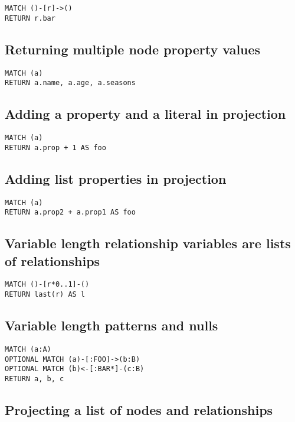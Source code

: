 \begin{lstlisting}
MATCH ()-[r]->()
RETURN r.bar
\end{lstlisting}

\subsection{Returning multiple node property values}

\begin{lstlisting}
MATCH (a)
RETURN a.name, a.age, a.seasons
\end{lstlisting}

\subsection{Adding a property and a literal in projection}

\begin{lstlisting}
MATCH (a)
RETURN a.prop + 1 AS foo
\end{lstlisting}

\subsection{Adding list properties in projection}

\begin{lstlisting}
MATCH (a)
RETURN a.prop2 + a.prop1 AS foo
\end{lstlisting}

\subsection{Variable length relationship variables are lists of relationships}

\begin{lstlisting}
MATCH ()-[r*0..1]-()
RETURN last(r) AS l
\end{lstlisting}

\subsection{Variable length patterns and nulls}

\begin{lstlisting}
MATCH (a:A)
OPTIONAL MATCH (a)-[:FOO]->(b:B)
OPTIONAL MATCH (b)<-[:BAR*]-(c:B)
RETURN a, b, c
\end{lstlisting}

\subsection{Projecting a list of nodes and relationships}

